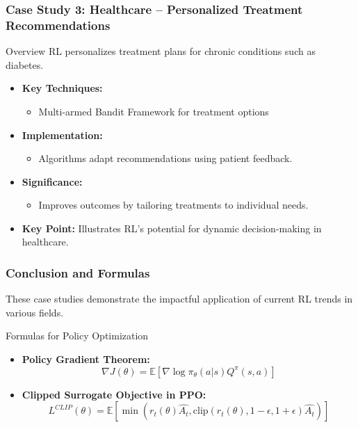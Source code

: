 \documentclass{beamer}
\begin{document}
\begin{frame}[fragile]
    \frametitle{Case Study 3: Healthcare – Personalized Treatment Recommendations}
    \begin{block}{Overview}
        RL personalizes treatment plans for chronic conditions such as diabetes.
    \end{block}
    \begin{itemize}
        \item \textbf{Key Techniques:}
            \begin{itemize}
                \item Multi-armed Bandit Framework for treatment options
            \end{itemize}
        \item \textbf{Implementation:}
            \begin{itemize}
                \item Algorithms adapt recommendations using patient feedback.
            \end{itemize}
        \item \textbf{Significance:}
            \begin{itemize}
                \item Improves outcomes by tailoring treatments to individual needs.
            \end{itemize}
        \item \textbf{Key Point:} Illustrates RL's potential for dynamic decision-making in healthcare.
    \end{itemize}
\end{frame}

\begin{frame}[fragile]
    \frametitle{Conclusion and Formulas}
    These case studies demonstrate the impactful application of current RL trends in various fields.
    \begin{block}{Formulas for Policy Optimization}
        \begin{itemize}
            \item \textbf{Policy Gradient Theorem:}
            \[
            \nabla J(\theta) = \mathbb{E}\left[ \nabla \log \pi_\theta(a|s) Q^\pi(s,a) \right]
            \]
            \item \textbf{Clipped Surrogate Objective in PPO:}
            \[
            L^{CLIP}(\theta) = \mathbb{E}\left[ \min\left( r_t(\theta) \hat{A_t}, \text{clip}(r_t(\theta), 1 - \epsilon, 1 + \epsilon)\hat{A_t} \right) \right]
            \]
        \end{itemize}
    \end{block}
\end{frame}
\end{document}

